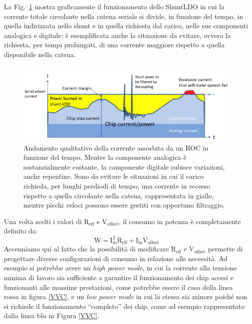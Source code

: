 La Fig.~\ref{SLDOprinciple} mostra graficamente il funzionamento dello ShuntLDO in cui la corrente totale circolante nella catena seriale si divide, in funzione del tempo, in quella indirizzata nello shunt e in quella richiesta dal carico, nelle sue componenti analogica e digitale; \`e esemplificata anche la situazione da evitare, ovvero la richiesta, per tempi prolungati, di una corrente maggiore rispetto a quella disponibile nella catena.
\begin{figure}[!htbp]
\centering
\includegraphics[scale=.5]{Immagini/ShuntRegulatorPrinciple}
\caption{Andamento qualitativo della corrente assorbita da un ROC in funzione del tempo. Mentre la componente analogica \`e sostanzialmente costante, la componente digitale subisce variazioni, anche repentine. Sono da evitare le situazioni in cui il carico richieda, per lunghi perdiodi di tempo, una corrente in eccesso rispetto a quella circolante nella catena, rappresentata in giallo, mentre picchi veloci possono essere gestiti con opportuno filtraggio.}
\label{SLDOprinciple}
\end{figure}

 
Una volta scelti i valori di $\mathrm{R_{eff}}$ e $\mathrm{V_{offset}}$, il consumo in potenza è completamente definito da:
\begin{equation}
\mathrm{W=I_{in}^2R_{eff}+I_{in}V_{offset}}
\end{equation}
Accenniamo qui al fatto che la possibilità di modificare $\mathrm{R_{eff}}$ e $\mathrm{V_{offset}}$ permette di progettare diverse configurazioni di consumo in relazione alle necessità.
Ad esempio si potrebbe avere un \textit{high power mode}, in cui la corrente alla tensione minima di lavoro sia sufficiente a garantire il funzionamento dei chip accesi e funzionanti alle massime prestazioni, come potrebbe essere il caso della linea rossa in figura \ref{VVC}, e un \textit{low power mode} in cui la stessa sia minore poiché non si richiede il funzionamento ``completo'' dei chip, come ad esempio rappresentato dalla linea blu in Figura \ref{VVC}.

